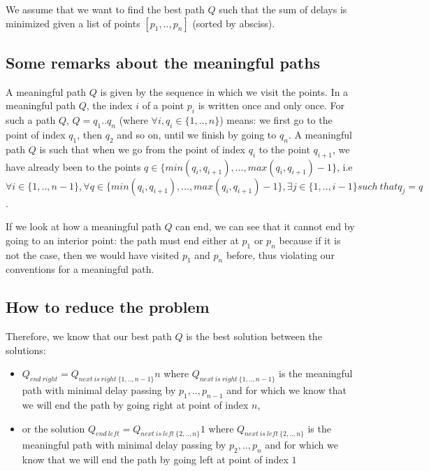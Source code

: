 We assume that we want to find the best path $Q$ such that the sum of delays is minimized given a list of points $[p_1,..,p_n]$ (sorted by absciss).

\subsection*{Some remarks about the meaningful paths}

A meaningful path $Q$ is given by the sequence in which we visit the points. In a meaningful path $Q$, the index $i$ of a point $p_i$ is written once and only once.
\newline
For such a path $Q$, $Q=q_1..q_n$ (where $\forall i, q_i \in \{1,..,n\}$) means: we first go to the point of index $q_1$, then $q_2$ and so on, until we finish by going to $q_n$.
\newline
A meaningful path $Q$ is such that when we go from the point of index $q_i$ to the point $q_{i+1}$, we have already been to the points $q \in \{min(q_i,q_{i+1}), ..., max(q_i, q_{i+1})-1\}$, i.e $\forall i \in \{1,..,n-1\}, \forall q \in \{min(q_i,q_{i+1}), ..., max(q_i, q_{i+1})-1\}, \exists j \in \{1,..,i-1\} such\  that q_j=q$.

If we look at how a meaningful path $Q$ can end, we can see that it cannot end by going to an interior point: the path must end either at $p_1$ or $p_n$ because if it is not the case, then we would have visited $p_1$ and $p_n$ before, thus violating our conventions for a meaningful path.

\subsection*{How to reduce the problem}

Therefore, we know that our best path $Q$ is the best solution between the solutions:
\begin{itemize}
\item $Q_{end\ right}=Q_{next\ is\ right\ \{1,..,n-1\}}n$ where $Q_{next\ is\ right\ \{1,..,n-1\}}$ is the meaningful path with minimal delay passing by $p_1,..,p_{n-1}$ and for which we know that we will end the path by going right at point of index $n$,
\item or the solution $Q_{end\ left}=Q_{next\ is\ left\ \{2,..,n\}}1$ where $Q_{next\ is\ left\ \{2,..,n\}}$ is the meaningful path with minimal delay passing by $p_2,..,p_n$ and for which we know that we will end the path by going left at point of index $1$
\end{itemize}

